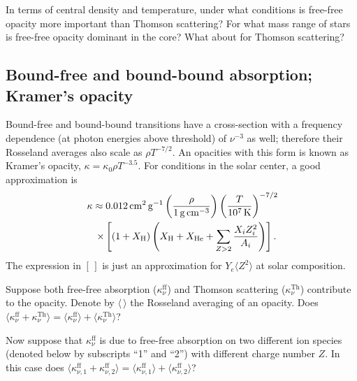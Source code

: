 \begin{exercisebox} In terms of central density and temperature, under what conditions is free-free opacity more important than Thomson scattering?  For what mass range of stars is free-free opacity dominant in the core? What about for Thomson scattering?
\end{exercisebox}

\subsection{Bound-free and bound-bound absorption; Kramer's opacity}
Bound-free and bound-bound transitions have a cross-section with a frequency dependence (at photon energies above threshold) of $\nu^{-3}$ as well; therefore their Rosseland averages also scale as $\rho T^{-7/2}$.  An opacities with this form is known as {Kramer's opacity}, $\kappa = \kappa_{0}\rho T^{-3.5}$.  For conditions in the solar center, a good approximation is
\begin{eqnarray}
\lefteqn{\kappa \approx 0.012\nsp\cm^{2}\usp\gram^{-1}\left(\frac{\rho}{1\nsp\grampercc}\right) \left(\frac{T}{10^{7}\nsp\K}\right)^{-7/2}} \nonumber\\
&& \times\left[\left(1+X_{\mathrm{H}}\right)\left(X_{\mathrm{H}} + X_{\mathrm{He}} + \sum_{Z>2}\frac{X_{i}Z_{i}^{2}}{A_{i}}\right)\right].
\label{e.kramers-opacity}
\end{eqnarray}
The expression in $[\,]$ is just an approximation for $Y_{e}\langle Z^{2}\rangle$ at solar composition.

\begin{exercisebox}
 Suppose both free-free absorption ($\kappa^{\mathrm{ff}}_{\nu}$) and Thomson scattering ($\kappa^{\mathrm{Th}}_{\nu}$) contribute to the opacity. Denote by $\langle\,\rangle$ the Rosseland averaging of an opacity.  Does $\langle \kappa^{\mathrm{ff}}_{\nu} + \kappa^{\mathrm{Th}}_{\nu}\rangle = \langle\kappa^{\mathrm{ff}}_{\nu}\rangle+\langle\kappa^{\mathrm{Th}}_{\nu}\rangle$? 

Now suppose that $\kappa^{\mathrm{ff}}_{\nu}$ is due to free-free absorption on two different ion species (denoted below by subscripts ``1'' and ``2'') with different charge number $Z$.  In this case does $\langle \kappa^{\mathrm{ff}}_{\nu,1} + \kappa^{\mathrm{ff}}_{\nu,2}\rangle = \langle\kappa^{\mathrm{ff}}_{\nu,1}\rangle+\langle\kappa^{\mathrm{ff}}_{\nu,2}\rangle$?
\end{exercisebox}


